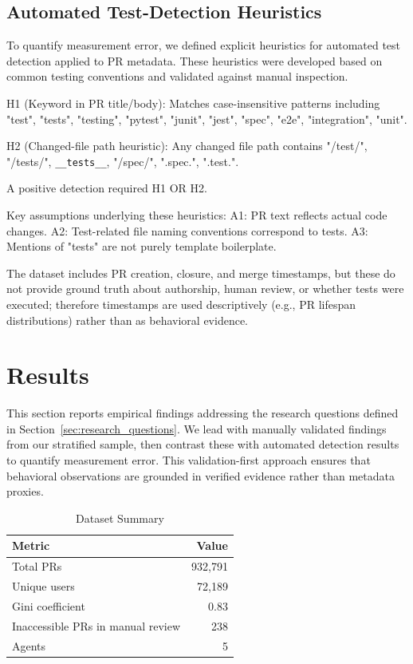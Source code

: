 \documentclass[conference]{IEEEtran}
\begin{document}
\subsection{Automated Test-Detection Heuristics}

To quantify measurement error, we defined explicit heuristics for automated test detection applied to PR metadata. These heuristics were developed based on common testing conventions and validated against manual inspection.

H1 (Keyword in PR title/body): Matches case-insensitive patterns including "test", "tests", "testing", "pytest", "junit", "jest", "spec", "e2e", "integration", "unit".

H2 (Changed-file path heuristic): Any changed file path contains "/test/", "/tests/", \texttt{__tests__}, "/spec/", ".spec.", ".test.".

A positive detection required H1 OR H2.

Key assumptions underlying these heuristics:
A1: PR text reflects actual code changes.
A2: Test-related file naming conventions correspond to tests.
A3: Mentions of "tests" are not purely template boilerplate.

The dataset includes PR creation, closure, and merge timestamps, but these do not provide ground truth about authorship, human review, or whether tests were executed; therefore timestamps are used descriptively (e.g., PR lifespan distributions) rather than as behavioral evidence.

\section{Results}

This section reports empirical findings addressing the research questions defined in Section~\ref{sec:research_questions}. We lead with manually validated findings from our stratified sample, then contrast these with automated detection results to quantify measurement error. This validation-first approach ensures that behavioral observations are grounded in verified evidence rather than metadata proxies.

\begin{table}[t]
\centering
\caption{Dataset Summary}\label{tab:dataset_summary}
\begin{tabular}{@{}lr@{}}
\toprule
\textbf{Metric} & \textbf{Value} \\
\midrule
Total PRs & 932,791 \\
Unique users & 72,189 \\
Gini coefficient & 0.83 \\
Inaccessible PRs in manual review & 238 \\
Agents & 5 \\
\bottomrule
\end{tabular}
\end{table}
\end{document}
